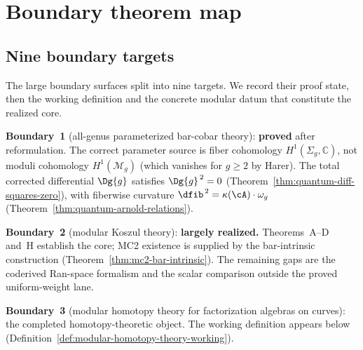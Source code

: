 \section{Boundary theorem map}
\label{sec:programme-status-assessment}

\subsection{Nine boundary targets}\label{subsec:nine-futures}

The large boundary surfaces split into nine targets. We record their
proof state, then the working definition and the concrete modular datum
that constitute the realized core.

\medskip

\noindent\textbf{Boundary~1} (all-genus parameterized bar-cobar theory):
\textbf{proved} after reformulation. The correct parameter source
is fiber cohomology $H^1(\Sigma_g, \mathbb{C})$, not moduli cohomology
$H^1(\mathcal{M}_g)$ (which vanishes for $g \geq 2$ by Harer).
The total corrected differential $\Dg{g}$ satisfies
$\Dg{g}^{\,2} = 0$ (Theorem~\ref{thm:quantum-diff-squares-zero}),
with fiberwise curvature $\dfib^{\,2} = \kappa(\cA)\cdot\omega_g$
(Theorem~\ref{thm:quantum-arnold-relations}).

\noindent\textbf{Boundary~2} (modular Koszul theory):
\textbf{largely realized.}
Theorems~A--D and~H establish the core; MC2 existence is supplied by
the bar-intrinsic construction
(Theorem~\ref{thm:mc2-bar-intrinsic}). The remaining gaps are the
coderived Ran-space formalism and the scalar comparison outside the
proved uniform-weight lane.

\noindent\textbf{Boundary~3} (modular homotopy theory for factorization
algebras on curves): the completed homotopy-theoretic object.
The working definition appears below
(Definition~\ref{def:modular-homotopy-theory-working}).


